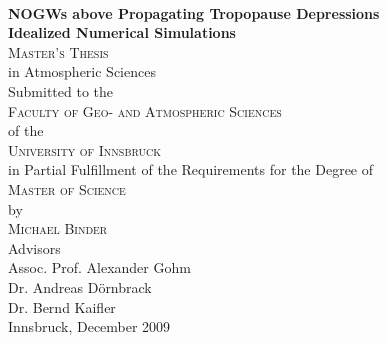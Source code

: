\begin{titlepage}
\begin{center}

~\\[15mm]
{\Huge  {\bf NOGWs above Propagating Tropopause Depressions}}\\[5mm]


{\LARGE {\bf Idealized Numerical Simulations}}\\[\spaceTitlepage]


{\Large \textsc{Master's Thesis}} \\[\spaceTitlepage]


{\large in Atmospheric Sciences} \\[\spaceTitlepage]


{\large Submitted to the} \\[2mm]
{\Large \textsc{Faculty of Geo- and Atmospheric Sciences}} \\[2mm]
{\large of the} \\[2mm]
{\Large \textsc{University of Innsbruck}} \\[\spaceTitlepage]


{\large in Partial Fulfillment of the Requirements for the Degree of} \\[2mm]
{\Large \textsc{Master of Science}} \\[\spaceTitlepage]


{\large by} \\[2mm]
{\Large \textsc{Michael Binder}} \\[\spaceTitlepage]


{\large Advisors} \\[2mm]
{\large Assoc. Prof. Alexander Gohm} \\ [2mm]
{\large Dr. Andreas Dörnbrack} \\ [2mm]
{\large Dr. Bernd Kaifler} \\[\spaceTitlepage]


{\large Innsbruck, December 2009}

\end{center}
\end{titlepage}
